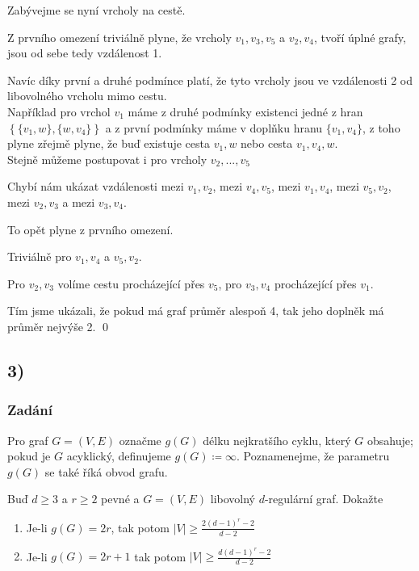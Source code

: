 \documentclass[../main.tex]{subfiles}
\begin{document}
Zabývejme se nyní vrcholy na cestě.

Z prvního omezení triviálně plyne, že vrcholy $v_1, v_3, v_5$  a $v_2, v_4$,
tvoří úplné grafy, jsou od sebe tedy vzdálenost 1. 

Navíc díky první a druhé podmínce platí, že tyto
vrcholy jsou ve vzdálenosti 2 od libovolného vrcholu mimo cestu.\\
Například pro vrchol $v_1$ máme z druhé podmínky existenci jedné z 
hran $\left\{\{v_1, w\}, \{w, v_4\}\right\}$ a z první podmínky máme v doplňku hranu $\{v_1,v_4\}$, 
z toho plyne zřejmě plyne, že buď existuje cesta $v_1, w$ nebo cesta $v_1, v_4, w$.\\
Stejně můžeme postupovat i pro vrcholy $v_2, ... , v_5$


Chybí nám ukázat vzdálenosti mezi $v_1,v_2$, mezi $v_4,v_5$, mezi $v_1, v_4$, mezi $v_5, v_2$, mezi $v_2, v_3$ a mezi $v_3, v_4$.

To opět plyne z prvního omezení.

Triviálně pro $v_1, v_4$ a $v_5, v_2$.

Pro $v_2, v_3$ volíme cestu procházející přes $v_5$, pro $v_3, v_4$ procházející přes $v_1$.

Tím jsme ukázali, že pokud má graf průměr alespoň 4, tak jeho doplněk má průměr nejvýše 2.
\qed




\subsection{3)}
\subsubsection*{Zadání}
Pro graf $G=(V,E)$ označme $g(G)$ délku nejkratšího cyklu, který $G$ obsahuje; pokud je $G$ acyklický, definujeme $g(G)\coloneq \infty$.
Poznamenejme, že parametru $g(G)$ se také říká obvod grafu.

Buď $d\geq 3$ a $r\geq 2$ pevné a $G=(V,E)$ libovolný $d$-regulární graf. Dokažte
\begin{enumerate}
    \item Je-li $g(G)=2r$, tak  potom $|V| \geq \frac{2(d-1)^r -2}{d-2}$
    \item Je-li $g(G) = 2r + 1$ tak potom $|V|\geq \frac{d(d-1)^r -2}{d-2}$
\end{enumerate}
\end{document}

